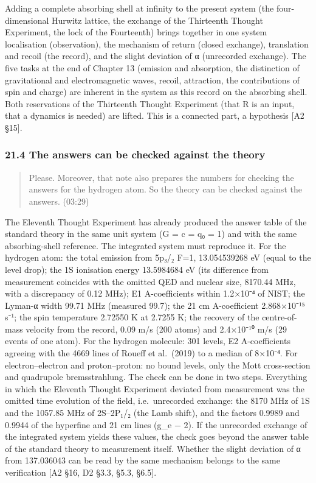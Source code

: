 \documentclass[
  a4paper,
]{article}
\begin{document}
Adding a complete absorbing shell at infinity to the present system (the
four-dimensional Hurwitz lattice, the exchange of the Thirteenth Thought
Experiment, the lock of the Fourteenth) brings together in one system
localisation (observation), the mechanism of return (closed exchange),
translation and recoil (the record), and the slight deviation of α
(unrecorded exchange). The five tasks at the end of Chapter 13 (emission
and absorption, the distinction of gravitational and electromagnetic
waves, recoil, attraction, the contributions of spin and charge) are
inherent in the system as this record on the absorbing shell. Both
reservations of the Thirteenth Thought Experiment (that R is an input,
that a dynamics is needed) are lifted. This is a connected part, a
hypothesis {[}A2 §15{]}.

\subsubsection{21.4 The answers can be checked against the
theory}\label{the-answers-can-be-checked-against-the-theory}

\begin{quote}
Please. Moreover, that note also prepares the numbers for checking the
answers for the hydrogen atom. So the theory can be checked against the
answers. (03:29)
\end{quote}

The Eleventh Thought Experiment has already produced the answer table of
the standard theory in the same unit system (G = c = q₀ = 1) and with
the same absorbing-shell reference. The integrated system must reproduce
it. For the hydrogen atom: the total emission from 5p₃/₂ F=1,
13.054539268 eV (equal to the level drop); the 1S ionisation energy
13.5984684 eV (its difference from measurement coincides with the
omitted QED and nuclear size, 8170.44 MHz, with a discrepancy of 0.12
MHz); E1 A-coefficients within 1.2×10⁻⁴ of NIST; the Lyman-α width 99.71
MHz (measured 99.7); the 21 cm A-coefficient 2.868×10⁻¹⁵ s⁻¹; the spin
temperature 2.72550 K at 2.7255 K; the recovery of the centre-of-mass
velocity from the record, 0.09 m/s (200 atoms) and 2.4×10⁻¹⁰ m/s (29
events of one atom). For the hydrogen molecule: 301 levels, E2
A-coefficients agreeing with the 4669 lines of Roueff et al.~(2019) to a
median of 8×10⁻⁴. For electron--electron and proton--proton: no bound
levels, only the Mott cross-section and quadrupole bremsstrahlung. The
check can be done in two steps. Everything in which the Eleventh Thought
Experiment deviated from measurement was the omitted time evolution of
the field, i.e.~unrecorded exchange: the 8170 MHz of 1S and the 1057.85
MHz of 2S--2P₁/₂ (the Lamb shift), and the factors 0.9989 and 0.9944 of
the hyperfine and 21 cm lines (g\_e − 2). If the unrecorded exchange of
the integrated system yields these values, the check goes beyond the
answer table of the standard theory to measurement itself. Whether the
slight deviation of α from 137.036043 can be read by the same mechanism
belongs to the same verification {[}A2 §16, D2 §3.3, §5.3, §6.5{]}.
\end{document}
